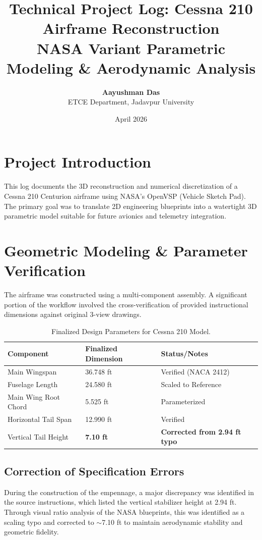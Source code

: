 \documentclass[11pt,a4paper]{article}
\title{
    \vspace{-2cm}
    \textbf{\textcolor{japurple}{Technical Project Log: Cessna 210 Airframe Reconstruction}} \\
    \large NASA Variant Parametric Modeling \& Aerodynamic Analysis
}
\author{\textbf{Aayushman Das} \\ ETCE Department, Jadavpur University}
\date{April 2026}
\begin{document}
\maketitle

\section{Project Introduction}
This log documents the 3D reconstruction and numerical discretization of a Cessna 210 Centurion airframe using NASA's OpenVSP (Vehicle Sketch Pad). The primary goal was to translate 2D engineering blueprints into a watertight 3D parametric model suitable for future avionics and telemetry integration.

\section{Geometric Modeling \& Parameter Verification}
The airframe was constructed using a multi-component assembly. A significant portion of the workflow involved the cross-verification of provided instructional dimensions against original 3-view drawings.

\begin{table}[h!]
\centering
\renewcommand{\arraystretch}{1.2}
\begin{tabular}{@{}lll@{}}
\toprule
\textbf{Component} & \textbf{Finalized Dimension} & \textbf{Status/Notes} \\ \midrule
Main Wingspan & 36.748 ft & Verified (NACA 2412) \\
Fuselage Length & 24.580 ft & Scaled to Reference \\
Main Wing Root Chord & 5.525 ft & Parameterized \\
Horizontal Tail Span & 12.990 ft & Verified \\
Vertical Tail Height & \textbf{7.10 ft} & \textbf{Corrected from 2.94 ft typo} \\ \bottomrule
\end{tabular}
\caption{Finalized Design Parameters for Cessna 210 Model.}
\end{table}

\subsection{Correction of Specification Errors}
During the construction of the empennage, a major discrepancy was identified in the source instructions, which listed the vertical stabilizer height at 2.94 ft. Through visual ratio analysis of the NASA blueprints, this was identified as a scaling typo and corrected to $\sim$7.10 ft to maintain aerodynamic stability and geometric fidelity.
\end{document}
